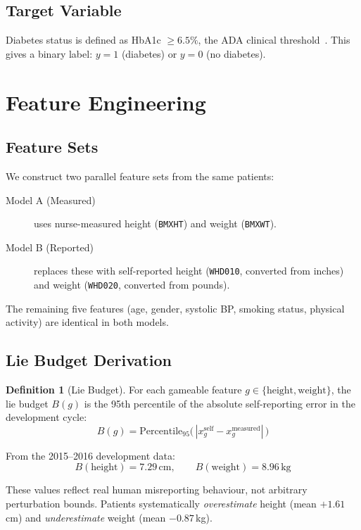 \documentclass[12pt, a4paper, oneside]{report}
\theoremstyle{definition}
\newtheorem{definition}{Definition}[chapter]
\begin{document}
\subsection{Target Variable}

Diabetes status is defined as HbA1c $\geq 6.5\%$, the ADA clinical
threshold~\citep{ada2023standards}. This gives a binary label:
$y = 1$ (diabetes) or $y = 0$ (no diabetes).

\section{Feature Engineering}

\subsection{Feature Sets}

We construct two parallel feature sets from the same patients:

\begin{description}
  \item[Model A (Measured)] uses nurse-measured height (\texttt{BMXHT}) and
       weight (\texttt{BMXWT}).
  \item[Model B (Reported)] replaces these with self-reported height
       (\texttt{WHD010}, converted from inches) and weight (\texttt{WHD020},
       converted from pounds).
\end{description}

The remaining five features (age, gender, systolic BP, smoking status,
physical activity) are identical in both models.

\subsection{Lie Budget Derivation}

\begin{definition}[Lie Budget]
  For each gameable feature $g \in \{\text{height}, \text{weight}\}$, the
  lie budget $B(g)$ is the 95th percentile of the absolute self-reporting
  error in the development cycle:
  \[
    B(g) = \mathrm{Percentile}_{95}\bigl(\,|x_g^{\text{self}} - x_g^{\text{measured}}|\,\bigr)
  \]
\end{definition}

From the 2015--2016 development data:
\[
  B(\text{height}) = 7.29\,\text{cm}, \qquad B(\text{weight}) = 8.96\,\text{kg}
\]

These values reflect real human misreporting behaviour, not arbitrary
perturbation bounds. Patients systematically \textit{overestimate} height
(mean $+1.61$\,cm) and \textit{underestimate} weight (mean $-0.87$\,kg).
\end{document}
